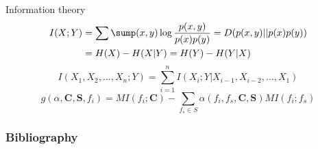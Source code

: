 \documentclass{beamer}
\begin{document}
\begin{frame}{Information theory}
\begin{equation}
\begin{split}
I(X;Y)&=\sum\sump(x,y)\log\dfrac{p(x,y)}{p(x)p(y)}=D(p(x,y)||p(x)p(y)) \\
&=H(X)-H(X|Y)=H(Y)-H(Y|X)
\end{split}
\end{equation}
\begin{equation}
I(X_{1},X_{2},...,X_{n};Y)=\sum^{n}_{i=1}I(X_{i};Y|X_{i-1},X_{i-2},...,X_{1})
\end{equation}
\begin{equation}
g(\alpha,\textbf{C},\textbf{S},f_{i})=MI(f_{i};\textbf{C})-\sum_{f_{s}\in S}\alpha(f_{i},f_{s},\textbf{C},\textbf{S})MI(f_{i};f_{s})
\end{equation}
\end{frame}

\begin{frame}[t,allowframebreaks]
\frametitle{Bibliography}
\printbibliography
\end{frame}
\end{document}
